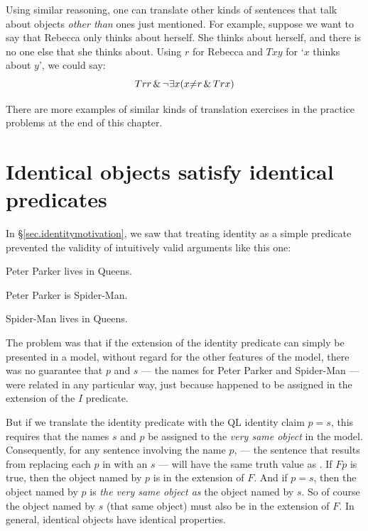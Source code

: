 Using similar reasoning, one can translate other kinds of sentences that talk about objects \emph{other than} ones just mentioned. For example, suppose we want to say that Rebecca only thinks about herself. She thinks about herself, and there is no one else that she thinks about. Using $r$ for Rebecca and $Txy$ for `$x$ thinks about $y$', we could say: $$Trr \,\&\, \neg \exists x (x {\neq} r \,\&\, Trx)$$

There are more examples of similar kinds of translation exercises in the practice problems at the end of this chapter.

\section{Identical objects satisfy identical predicates}

In \S\ref{sec.identitymotivation}, we saw that treating identity as a simple predicate prevented the validity of intuitively valid arguments like  this one:

\begin{earg}
\item[\ref{ppq}] Peter Parker lives in Queens.
\item[\ref{pps}] Peter Parker is Spider-Man.
\item[\ref{sq}] Spider-Man lives in Queens.
\end{earg}

The problem was that if the extension of the identity predicate can simply be presented in a model, without regard for the other features of the model, there was no guarantee that $p$ and $s$ --- the names for Peter Parker and Spider-Man --- were related in any particular way, just because  happened to be assigned in the extension of the $I$ predicate.

But if we translate the identity predicate with the QL identity claim $p{=}s$, this requires that the names $s$ and $p$ be assigned to the \emph{very same object} in the model. Consequently, for any sentence \metaA{} involving the name $p$, \metaA{} --- the sentence that results from replacing each $p$ in \metaA{} with an $s$ --- will have the same truth value as \metaA{}. If $Fp$ is true, then the object named by $p$ is in the extension of $F$. And if $p{=}s$, then the object named by $p$ is \emph{the very same object as} the object named by $s$. So of course the object named by $s$ (that same object) must also be in the extension of $F$. In general, identical objects have identical properties.

